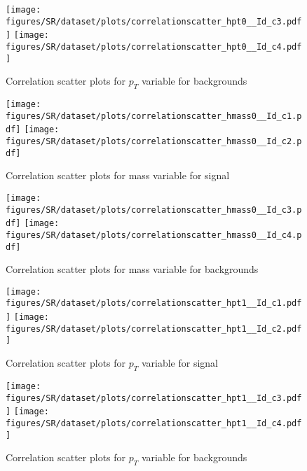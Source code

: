 \begin{figure}[!htb]%
\centering
\texttt{[image: figures/SR/dataset/plots/correlationscatter\_hpt0\_\_Id\_c3.pdf]}
\texttt{[image: figures/SR/dataset/plots/correlationscatter\_hpt0\_\_Id\_c4.pdf]}
\caption{ Correlation scatter plots for \HZZ $p_{T}$ variable for backgrounds}%
\label{fig:correlations_SR_hpt0_BG}                                                       
\end{figure}
\clearpage

\begin{figure}[!htb]%
\centering
\texttt{[image: figures/SR/dataset/plots/correlationscatter\_hmass0\_\_Id\_c1.pdf]}
\texttt{[image: figures/SR/dataset/plots/correlationscatter\_hmass0\_\_Id\_c2.pdf]}
\caption{ Correlation scatter plots for \HZZ mass  variable for signal}%
\label{fig:correlations_SR_hmass0_S}                                                       
\end{figure}
\clearpage


\begin{figure}[!htb]%
\centering
\texttt{[image: figures/SR/dataset/plots/correlationscatter\_hmass0\_\_Id\_c3.pdf]}
\texttt{[image: figures/SR/dataset/plots/correlationscatter\_hmass0\_\_Id\_c4.pdf]}
\caption{ Correlation scatter plots for \HZZ mass variable for backgrounds}%
\label{fig:correlations_SR_hmass0_BG}                                                       
\end{figure}
\clearpage



\begin{figure}[!htb]%
\centering
\texttt{[image: figures/SR/dataset/plots/correlationscatter\_hpt1\_\_Id\_c1.pdf]}
\texttt{[image: figures/SR/dataset/plots/correlationscatter\_hpt1\_\_Id\_c2.pdf]}
\caption{ Correlation scatter plots for \HBB $p_{T}$  variable for signal}%
\label{fig:correlations_SR_hpt1_S}                                                       
\end{figure}
\clearpage


\begin{figure}[!htb]%
\centering
\texttt{[image: figures/SR/dataset/plots/correlationscatter\_hpt1\_\_Id\_c3.pdf]}
\texttt{[image: figures/SR/dataset/plots/correlationscatter\_hpt1\_\_Id\_c4.pdf]}
\caption{ Correlation scatter plots for \HBB $p_{T}$ variable for backgrounds}%
\label{fig:correlations_SR_hpt1_BG}                                                       
\end{figure}
\clearpage


